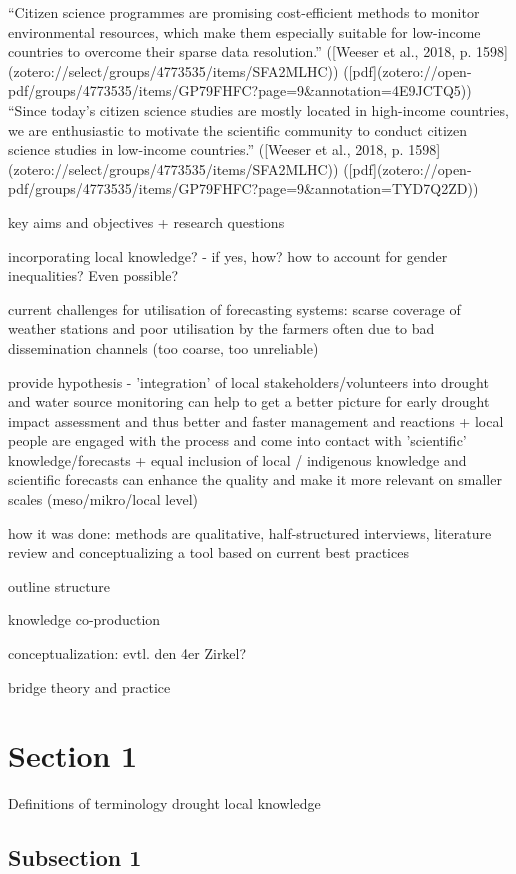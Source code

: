 “Citizen science programmes are promising cost-efficient methods to monitor environmental resources, which make them especially suitable for low-income countries to overcome their sparse data resolution.” ([Weeser et al., 2018, p. 1598](zotero://select/groups/4773535/items/SFA2MLHC)) ([pdf](zotero://open-pdf/groups/4773535/items/GP79FHFC?page=9&annotation=4E9JCTQ5))
“Since today's citizen science studies are mostly located in high-income countries, we are enthusiastic to motivate the scientific community to conduct citizen science studies in low-income countries.” ([Weeser et al., 2018, p. 1598](zotero://select/groups/4773535/items/SFA2MLHC)) ([pdf](zotero://open-pdf/groups/4773535/items/GP79FHFC?page=9&annotation=TYD7Q2ZD))


key aims and objectives + research questions

incorporating local knowledge? - if yes, how?
how to account for gender inequalities? Even possible?

current challenges for utilisation of forecasting systems: scarse coverage of weather stations and poor utilisation by the farmers often due to bad dissemination channels  (too coarse, too unreliable)

provide hypothesis - 'integration' of local stakeholders/volunteers into drought and water source monitoring can help to get a better picture for early drought impact assessment and thus better and faster management and reactions
+ local people are engaged with the process and come into contact with 'scientific' knowledge/forecasts 
+ equal inclusion of local / indigenous knowledge and scientific forecasts can enhance the quality and make it more relevant on smaller scales (meso/mikro/local level)


how it was done: methods are qualitative, half-structured interviews, literature review and conceptualizing a tool based on current best practices

outline structure

knowledge co-production
\autocite{dasInteractiveInformationCrowdsourcing2016}

conceptualization: evtl. den 4er Zirkel?

bridge theory and practice
\section{Section 1}
Definitions of terminology
drought
local knowledge
\subsection{Subsection 1}



